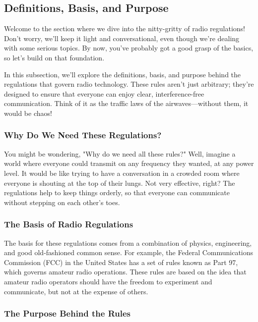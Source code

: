 \subsection{Definitions, Basis, and Purpose}
\label{subsec:reg-basis}

Welcome to the section where we dive into the nitty-gritty of radio regulations! Don't worry, we'll keep it light and conversational, even though we're dealing with some serious topics. By now, you've probably got a good grasp of the basics, so let's build on that foundation.

In this subsection, we'll explore the definitions, basis, and purpose behind the regulations that govern radio technology. These rules aren't just arbitrary; they're designed to ensure that everyone can enjoy clear, interference-free communication. Think of it as the traffic laws of the airwaves—without them, it would be chaos!

\subsubsection*{Why Do We Need These Regulations?}

You might be wondering, "Why do we need all these rules?" Well, imagine a world where everyone could transmit on any frequency they wanted, at any power level. It would be like trying to have a conversation in a crowded room where everyone is shouting at the top of their lungs. Not very effective, right? The regulations help to keep things orderly, so that everyone can communicate without stepping on each other's toes.

\subsubsection*{The Basis of Radio Regulations}

The basis for these regulations comes from a combination of physics, engineering, and good old-fashioned common sense. For example, the Federal Communications Commission (FCC) in the United States has a set of rules known as Part 97, which governs amateur radio operations. These rules are based on the idea that amateur radio operators should have the freedom to experiment and communicate, but not at the expense of others.

\subsubsection*{The Purpose Behind the Rules}


